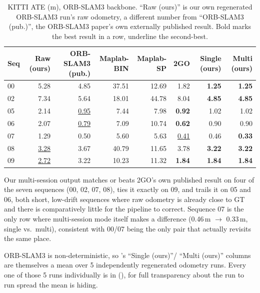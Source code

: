\begin{table}[htb]
  \centering
  \footnotesize
  \begin{tabular*}{\textwidth}{@{\extracolsep{\fill}} lrrrrrrr}
  \hline
  \textbf{Seq} & \textbf{Raw (ours)} & \textbf{ORB-SLAM3 (pub.)} & \textbf{Maplab-BIN} & \textbf{Maplab-SP} & \textbf{2GO} & \textbf{Single (ours)} & \textbf{Multi (ours)} \\
  \hline
  00 & 5.28 & 4.85 & 37.51 & 12.69 & 1.82 & \textbf{1.25} & \textbf{1.25} \\
  02 & 7.34 & 5.64 & 18.01 & 44.78 & 8.04 & \textbf{4.85} & \textbf{4.85} \\
  05 & 2.14 & \underline{0.95} & 7.44 & 7.98 & \textbf{0.92} & 1.02 & 1.02 \\
  06 & 2.07 & \underline{0.79} & 7.09 & 10.74 & \textbf{0.62} & 0.90 & 0.90 \\
  07 & 1.29 & 0.50 & 5.60 & 5.63 & \underline{0.41} & 0.46 & \textbf{0.33} \\
  08 & \underline{3.28} & 3.67 & 40.79 & 11.65 & 3.78 & \textbf{3.22} & \textbf{3.22} \\
  09 & \underline{2.72} & 3.22 & 10.23 & 11.32 & \textbf{1.84} & \textbf{1.84} & \textbf{1.84} \\
  \hline
  \end{tabular*}
  \caption[KITTI ATE, ORB-SLAM3 backbone]{KITTI ATE (m), ORB-SLAM3 backbone. ``Raw (ours)'' is
    our own regenerated ORB-SLAM3 run's raw odometry, a different number from ``ORB-SLAM3
    (pub.)'', the ORB-SLAM3 paper's own externally published result. Bold marks the best result
    in a row, underline the second-best.}
  \label{tab:experiments-kitti-orb}
\end{table}

Our multi-session output matches or beats 2GO's own published result on four of the seven
sequences (00, 02, 07, 08), ties it exactly on 09, and trails it on 05 and 06, both short,
low-drift sequences where raw odometry is already close to GT and there is comparatively little
for the pipeline to correct. Sequence 07 is the only row where multi-session mode itself makes a
difference (0.46\,m $\to$ 0.33\,m, single vs.\ multi), consistent with 00/07 being the only pair
that actually revisits the same place.

ORB-SLAM3 is non-deterministic, so 's ``Single (ours)''/
``Multi (ours)'' columns are themselves a mean over 5 independently regenerated odometry runs.
Every one of those 5 runs individually is in 
(), for full transparency about the run to run spread the
mean is hiding.

